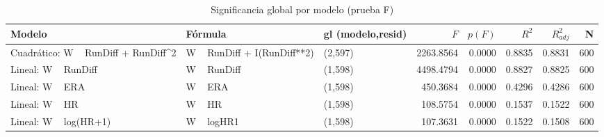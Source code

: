 \begin{table}
\caption{Significancia global por modelo (prueba F)}
\label{tab:significancia_global_ols}
\begin{tabular}{lllrrrrr}
\toprule
Modelo & Fórmula & gl (modelo,resid) & $F$ & $p(F)$ & $R^2$ & $R^2_{adj}$ & N \\
\midrule
Cuadrático: W ~ RunDiff + RunDiff^2 & W ~ RunDiff + I(RunDiff**2) & (2,597) & 2263.8564 & 0.0000 & 0.8835 & 0.8831 & 600 \\
Lineal: W ~ RunDiff & W ~ RunDiff & (1,598) & 4498.4794 & 0.0000 & 0.8827 & 0.8825 & 600 \\
Lineal: W ~ ERA & W ~ ERA & (1,598) & 450.3684 & 0.0000 & 0.4296 & 0.4286 & 600 \\
Lineal: W ~ HR & W ~ HR & (1,598) & 108.5754 & 0.0000 & 0.1537 & 0.1522 & 600 \\
Lineal: W ~ log(HR+1) & W ~ logHR1 & (1,598) & 107.3631 & 0.0000 & 0.1522 & 0.1508 & 600 \\
\bottomrule
\end{tabular}
\end{table}

